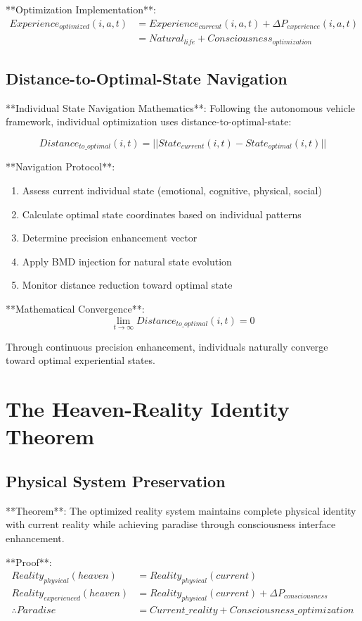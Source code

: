 \documentclass[12pt,a4paper]{article}
\begin{document}
**Optimization Implementation**:
\begin{align}
Experience_{optimized}(i,a,t) &= Experience_{current}(i,a,t) + \Delta P_{experience}(i,a,t)\\
&= Natural_{life} + Consciousness_{optimization}
\end{align}

\subsection{Distance-to-Optimal-State Navigation}

**Individual State Navigation Mathematics**:
Following the autonomous vehicle framework, individual optimization uses distance-to-optimal-state:

$$Distance_{to\_optimal}(i,t) = ||State_{current}(i,t) - State_{optimal}(i,t)||$$

**Navigation Protocol**:
\begin{enumerate}
\item Assess current individual state (emotional, cognitive, physical, social)
\item Calculate optimal state coordinates based on individual patterns
\item Determine precision enhancement vector
\item Apply BMD injection for natural state evolution
\item Monitor distance reduction toward optimal state
\end{enumerate}

**Mathematical Convergence**:
$$\lim_{t \to \infty} Distance_{to\_optimal}(i,t) = 0$$

Through continuous precision enhancement, individuals naturally converge toward optimal experiential states.

\section{The Heaven-Reality Identity Theorem}

\subsection{Physical System Preservation}

**Theorem**: The optimized reality system maintains complete physical identity with current reality while achieving paradise through consciousness interface enhancement.

**Proof**:
\begin{align}
Reality_{physical}(heaven) &= Reality_{physical}(current)\\
Reality_{experienced}(heaven) &= Reality_{physical}(current) + \Delta P_{consciousness}\\
\therefore Paradise &= Current\_reality + Consciousness\_optimization
\end{align}
\end{document}
